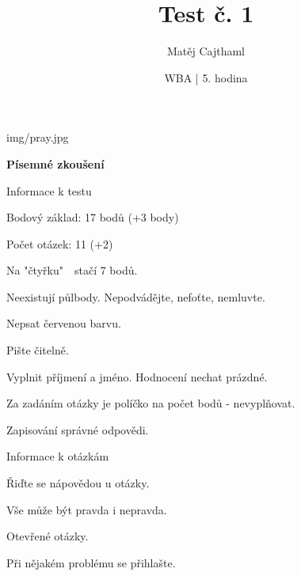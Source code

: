 \documentclass[aspectratio=1610]{beamer}
\title{Test č. 1}
\date{WBA | 5. hodina}
\author[Cajthaml]{Matěj Cajthaml}
\begin{document}
\begin{frame}
\titlepage
\end{frame}




\begin{frameImg}[width]{img/pray.jpg}
    \vspace*{60mm}
    \begin{cardTiny}
        \vspace*{\fill}
        \begin{center}
            \textbf{Písemné zkoušení}
        \end{center}
    \end{cardTiny}
\end{frameImg}


\begin{frame}{Informace k testu}
    \begin{cardTiny}
        \begin{flushleft}
            Bodový základ: 17 bodů (+3 body)

            Počet otázek: 11 (+2)

            Na "čtyřku"~~stačí 7 bodů.

            Neexistují půlbody. Nepodvádějte, nefoťte, nemluvte.

            \vspace{2ex}

            Nepsat červenou barvu.

            Pište čitelně.

            \vspace{2ex}

            Vyplnit příjmení a jméno. Hodnocení nechat prázdné.

            Za zadáním otázky je políčko na počet bodů - nevyplňovat.

            \vspace{2ex}
            Zapisování správné odpovědi.
        \end{flushleft}
    \end{cardTiny}
\end{frame}

\begin{frame}{Informace k otázkám}
    \begin{cardTiny}
        \begin{flushleft}
            Řiďte se nápovědou u otázky.

            Vše může být pravda i nepravda.  

            Otevřené otázky.
        \end{flushleft}
    \end{cardTiny}

    \begin{cardTiny}
        \begin{flushleft}
            Při nějakém problému se přihlašte.
        \end{flushleft}
    \end{cardTiny}
\end{frame}
\end{document}
